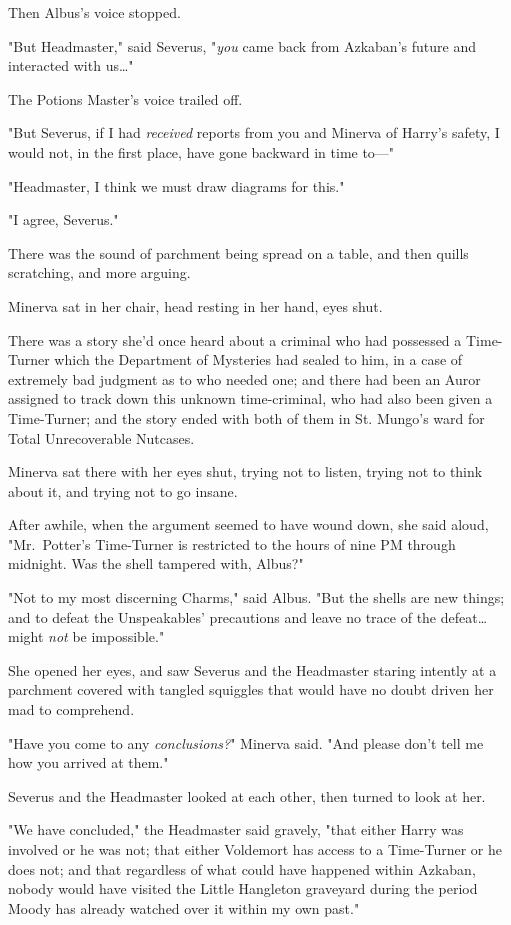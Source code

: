 Then Albus's voice stopped.

"But Headmaster," said Severus, "\emph{you} came back from Azkaban's future and 
interacted with us{\ldots}"

The Potions Master's voice trailed off.

"But Severus, if I had \emph{received} reports from you and Minerva of Harry's 
safety, I would not, in the first place, have gone backward in time to---"

"Headmaster, I think we must draw diagrams for this."

"I agree, Severus."

There was the sound of parchment being spread on a table, and then quills 
scratching, and more arguing.

Minerva sat in her chair, head resting in her hand, eyes shut.

There was a story she'd once heard about a criminal who had possessed a 
Time-Turner which the Department of Mysteries had sealed to him, in a case of 
extremely bad judgment as to who needed one; and there had been an Auror 
assigned to track down this unknown time-criminal, who had also been given a 
Time-Turner; and the story ended with both of them in St. Mungo's ward for 
Total Unrecoverable Nutcases.

Minerva sat there with her eyes shut, trying not to listen, trying not to think 
about it, and trying not to go insane.

After awhile, when the argument seemed to have wound down, she said aloud, 
"Mr.~Potter's Time-Turner is restricted to the hours of nine PM through 
midnight. Was the shell tampered with, Albus?"

"Not to my most discerning Charms," said Albus. "But the shells are new things; 
and to defeat the Unspeakables' precautions and leave no trace of the 
defeat{\ldots} might \emph{not} be impossible."

She opened her eyes, and saw Severus and the Headmaster staring intently at a 
parchment covered with tangled squiggles that would have no doubt driven her 
mad to comprehend.

"Have you come to any \emph{conclusions?}" Minerva said. "And please don't tell 
me how you arrived at them."

Severus and the Headmaster looked at each other, then turned to look at her.

"We have concluded," the Headmaster said gravely, "that either Harry was 
involved or he was not; that either Voldemort has access to a Time-Turner or he 
does not; and that regardless of what could have happened within Azkaban, 
nobody would have visited the Little Hangleton graveyard during the period 
Moody has already watched over it within my own past."

